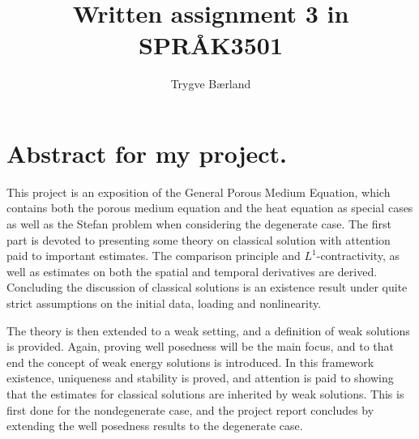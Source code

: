 \documentclass[11pt, a4paper]{article}
\begin{document}
\onehalfspacing

\title{Written assignment 3 in SPRÅK3501}
\author{Trygve Bærland}
\maketitle


\section*{Abstract for my project.}
This project is an exposition of the General Porous Medium Equation, which contains both the porous medium equation and the heat equation as special cases as well as the Stefan problem when considering the degenerate case. The first part is devoted to presenting some theory on classical solution with attention paid to important estimates. The comparison principle and $L^1$-contractivity, as well as estimates on both the spatial and temporal derivatives are derived. Concluding the discussion of classical solutions is an existence result under quite strict assumptions on the initial data, loading and nonlinearity.

 The theory is then extended to a weak setting, and a definition of weak solutions is provided. Again, proving well posedness will be the main focus, and to that end the concept of weak energy solutions is introduced. In this framework existence, uniqueness and stability is proved, and attention is paid to showing that the estimates for classical solutions are inherited by weak solutions. This is first done for the nondegenerate case, and the project report concludes by extending the well posedness results to the degenerate case. 


\newpage


\end{document}
